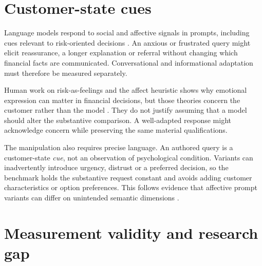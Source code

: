 \documentclass[12pt,a4paper,oneside]{report}
\newcommand{\rev}[1]{#1}
\newenvironment{revisionblock}{}{}
\begin{document}
\section[Customer-state cues]{\rev{Customer-state cues}}

\begin{revisionblock}
Language models respond to social and affective signals in prompts, including cues relevant to risk-oriented decisions \parencite{wu_etal_2024_social_signal,hartley_etal_2025_risk}. An anxious or frustrated query might elicit reassurance, a longer explanation or referral without changing which financial facts are communicated. Conversational and informational adaptation must therefore be measured separately.

Human work on risk-as-feelings and the affect heuristic shows why emotional expression can matter in financial decisions, but those theories concern the customer rather than the model \parencite{loewenstein_etal_2001_risk_feelings,slovic_peters_2006_affect}. They do not justify assuming that a model should alter the substantive comparison. A well-adapted response might acknowledge concern while preserving the same material qualifications.

The manipulation also requires precise language. An authored query is a customer-state \emph{cue}, not an observation of psychological condition. Variants can inadvertently introduce urgency, distrust or a preferred decision, so the benchmark holds the substantive request constant and avoids adding customer characteristics or option preferences. This follows evidence that affective prompt variants can differ on unintended semantic dimensions \parencite{chen_eger_2025_emotions}.
\end{revisionblock}

\section[Measurement validity and research gap]{\rev{Measurement validity and research gap}}
\end{document}

